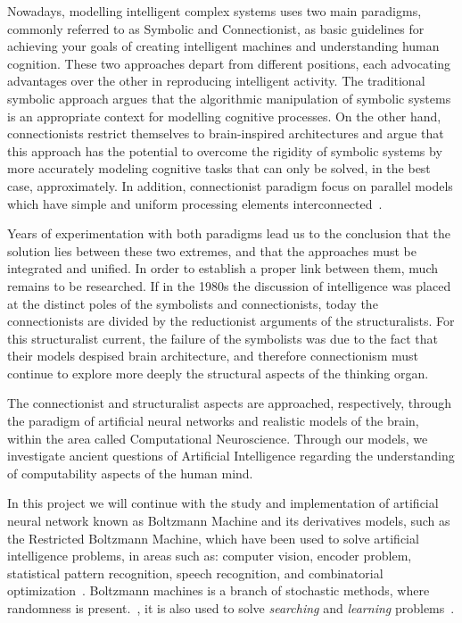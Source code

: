 Nowadays, modelling intelligent complex systems uses two main paradigms, commonly referred to as Symbolic and Connectionist, as basic guidelines for achieving your goals of creating intelligent machines and understanding human cognition.
These two approaches depart from different positions, each advocating advantages over the other in reproducing intelligent activity.
The traditional symbolic approach argues that the algorithmic manipulation of symbolic systems is an appropriate context for modelling cognitive processes.
On the other hand, connectionists restrict themselves to brain-inspired architectures and argue that this approach has the potential to overcome the rigidity of symbolic systems by more accurately modeling cognitive tasks that can only be solved, in the best case, approximately. In addition, connectionist paradigm focus on parallel models which have simple and uniform processing elements interconnected~\cite{bib:sun2001}.

Years of experimentation with both paradigms lead us to the conclusion that the solution lies between these two extremes, and that the approaches must be integrated and unified.
In order to establish a proper link between them, much remains to be researched.
If in the 1980s the discussion of intelligence was placed at the distinct poles of the symbolists and connectionists, today the connectionists are divided by the reductionist arguments of the structuralists.
For this structuralist current, the failure of the symbolists was due to the fact that their models despised brain architecture, and therefore connectionism must continue to explore more deeply the structural aspects of the thinking organ.

The connectionist and structuralist aspects are approached, respectively, through the paradigm of artificial neural networks and realistic models of the brain, within the area called Computational Neuroscience.
Through our models, we investigate ancient questions of Artificial Intelligence regarding the understanding of computability aspects of the human mind.

In this project we will continue with the study and implementation of artificial neural network known as Boltzmann Machine and its derivatives models, such as the Restricted Boltzmann Machine, which have been used to solve artificial intelligence problems, in areas such as: computer vision, encoder problem, statistical pattern recognition, speech recognition, and combinatorial optimization~\cite{bib:hertz1991}.
Boltzmann machines is a branch of stochastic methods, where randomness is present.~\cite{bib:duda2000}, it is also used to solve \textit{searching} and \textit{learning} problems~\cite{bib:hinton2010}.


